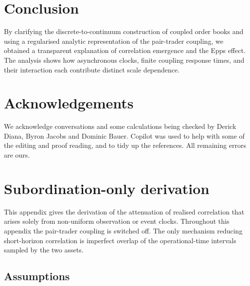 \documentclass[5p,final]{elsarticle}
\begin{document}
\section{Conclusion}

By clarifying the discrete-to-continuum construction of coupled order books and using a regularised analytic
representation of the pair-trader coupling, we obtained a transparent explanation of correlation emergence and
the Epps effect.
The analysis shows how asynchronous clocks, finite coupling response times, and their interaction each
contribute distinct scale dependence.

\section{Acknowledgements}

We acknowledge conversations and some calculations being checked by Derick Diana, Byron Jacobs and Dominic Bauer. Copilot was used to help with some of the editing and proof reading, and to tidy up the references. All remaining errors are ours.



\appendix

\section{Subordination-only derivation}\label{app:subordination-only}

This appendix gives the derivation of the attenuation of realised correlation that arises solely from non-uniform observation or event clocks.  Throughout this appendix the pair-trader coupling is switched off.  The only mechanism reducing short-horizon correlation is imperfect overlap of the operational-time intervals sampled by the two assets.

\subsection{Assumptions}
\end{document}
